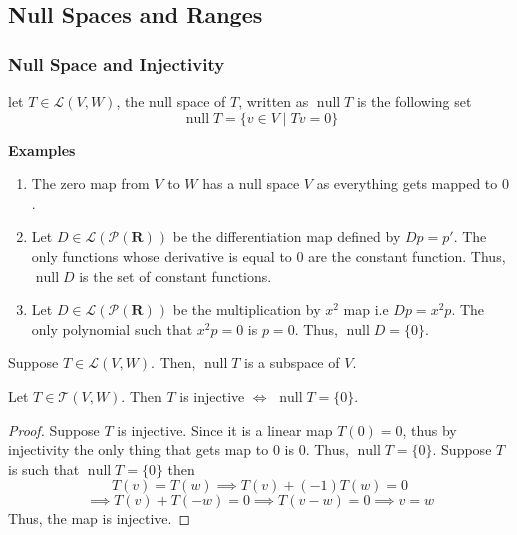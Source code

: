 \subsection{Null Spaces and Ranges}

\subsubsection{Null Space and Injectivity}
\begin{definition}
    let $T \in \mathcal{L}(V,W)$, the null space of $T$, written as $\operatorname{null}T$ is the following set
    \[ \operatorname{null} T = \{v \in V \mid Tv=0\} \]
\end{definition}

\textbf{Examples}

\begin{enumerate}
    \item The zero map from $V$ to $W$ has a null space $V$ as everything gets mapped to $0$.
    \item Let $D \in \mathcal{L}(\mathcal{P}(\mathbf{R}))$ be the differentiation map defined by $Dp=p'$. The only functions whose
          derivative is equal to $0$ are the constant function. Thus, $\operatorname{null} D$ is the set of constant functions.
    \item Let $D \in \mathcal{L}(\mathcal{P}(\mathbf{R}))$ be the multiplication by $x^2$ map i.e $Dp=x^2 p$. The only polynomial
          such that $x^2 p = 0$ is $p = 0$. Thus, $\operatorname{null} D = \{0\}$.
\end{enumerate}

\begin{proposition}
    Suppose $T \in \mathcal{L}(V,W)$. Then, $\operatorname{null} T$ is a subspace of $V$.
\end{proposition}

\begin{proposition}
    Let $T \in \mathcal{T}(V,W)$. Then $T$ is injective $\iff$  $\operatorname{null} T =\{0\}$. 
\end{proposition}

\begin{proof}
    Suppose $T$ is injective. Since it is a linear map $T(0)=0$, thus by injectivity the only thing that gets map to $0$ is $0$. Thus,
    $\operatorname{null} T = \{0\}$. Suppose $T$ is such that $\operatorname{null} T = \{0\}$ then 
    \[ T(v)=T(w) \implies T(v)+(-1)T(w)=0 \]
    \[ \implies T(v)+T(-w) = 0 \implies T(v-w)=0 \implies v=w \]
    Thus, the map is injective.
\end{proof}

